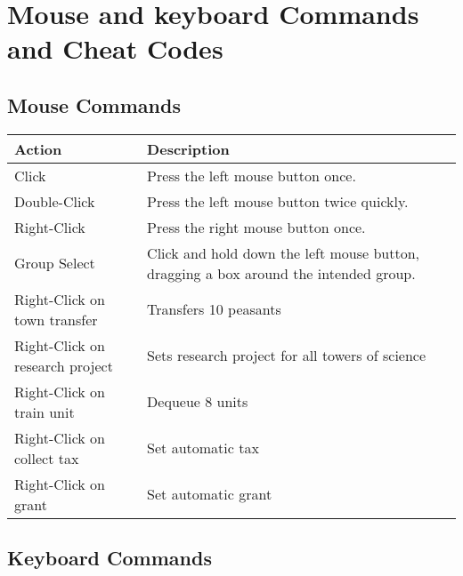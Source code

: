 
\chapter{Mouse and keyboard Commands and Cheat Codes}

\section{Mouse Commands}

\begin{tabular}{ | l | p{6cm} |}
	\hline
	Action	& Description \\ \hline
	Click	& Press the left mouse button once. \\ \hline
	Double-Click	& Press the left mouse button twice quickly. \\ \hline
	Right-Click	& Press the right mouse button once. \\ \hline
	Group Select	& Click and hold down the left mouse button, dragging a box around the intended group. \\ \hline
	Right-Click on town transfer	& Transfers 10 peasants \\ \hline
	Right-Click on research project	& Sets research project for all towers of science \\ \hline
	Right-Click on train unit	& Dequeue 8 units \\ \hline
	Right-Click on collect tax	& Set automatic tax \\ \hline
	Right-Click on grant	&  Set automatic grant \\
	\hline
	\end{tabular}

\section{Keyboard Commands}

